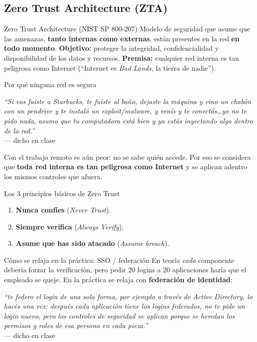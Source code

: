 \documentclass[11pt,a4paper]{article}
\newcommand{\prof}[1]{\par\medskip\noindent\textit{``#1''}\\[-2pt]\hspace*{1em}%
  {\footnotesize\textcolor{black!60}{--- dicho en clase}}\par\medskip\noindent}
\begin{document}
\subsection{Zero Trust Architecture (ZTA)}

\begin{defbox}{Zero Trust Architecture (NIST SP 800-207)}
Modelo de seguridad que asume que las amenazas, \textbf{tanto internas como externas}, están
presentes en la red \textbf{en todo momento}. \textbf{Objetivo:} proteger la integridad,
confidencialidad y disponibilidad de los datos y recursos. \textbf{Premisa:} cualquier red
interna es tan peligrosa como Internet (``Internet es \emph{Bad Lands}, la tierra de nadie'').
\end{defbox}

\begin{anecbox}{Por qué ninguna red es segura}
\prof{Si vos fuiste a Starbucks, te fuiste al baño, dejaste la máquina y vino un chabón con un
pendrive y te instaló un exploit/malware, y venís y te conectás\dots yo no te pido nada, asumo
que tu computadora está bien y ya estás inyectando algo dentro de la red.} Con el trabajo remoto
es aún peor: no se sabe quién accede. Por eso se considera que \textbf{toda red interna es tan
peligrosa como Internet} y se aplican adentro los mismos controles que afuera.
\end{anecbox}

\begin{defbox}{Los 3 principios básicos de Zero Trust}
\begin{enumerate}[leftmargin=1.6em,itemsep=1pt]
  \item \textbf{Nunca confíes} (\emph{Never Trust}).
  \item \textbf{Siempre verifica} (\emph{Always Verify}).
  \item \textbf{Asume que has sido atacado} (\emph{Assume breach}).
\end{enumerate}
\end{defbox}

\begin{anecbox}{Cómo se relaja en la práctica: SSO / federación}
En teoría \emph{cada} componente debería forzar la verificación, pero pedir 20 logins a 20
aplicaciones haría que el empleado se queje. En la práctica se relaja con \textbf{federación de
identidad}: \prof{te federo el login de una sola forma, por ejemplo a través de Active
Directory, lo hacés una vez; después cada aplicación tiene los logins federados, no te pide un
login nuevo, pero los controles de seguridad se aplican porque se heredan los permisos y roles
de esa persona en cada pieza.}
\end{anecbox}
\end{document}
